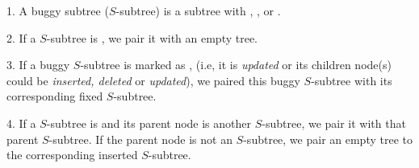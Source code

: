 1. A buggy subtree ($S$-subtree) is a subtree with
, , or .

2. If a $S$-subtree is , we pair it with an empty tree.

3. If a buggy $S$-subtree is marked as , (i.e, it is
{\em updated} or its children node(s) could be {\em inserted, deleted} or {\em
  updated}), we paired this buggy $S$-subtree with its corresponding
fixed $S$-subtree.

4. If a $S$-subtree is  and its parent node is another
$S$-subtree, we pair it with that parent $S$-subtree.  If the parent
node is not an $S$-subtree, we pair an empty tree to the corresponding
inserted $S$-subtree.




